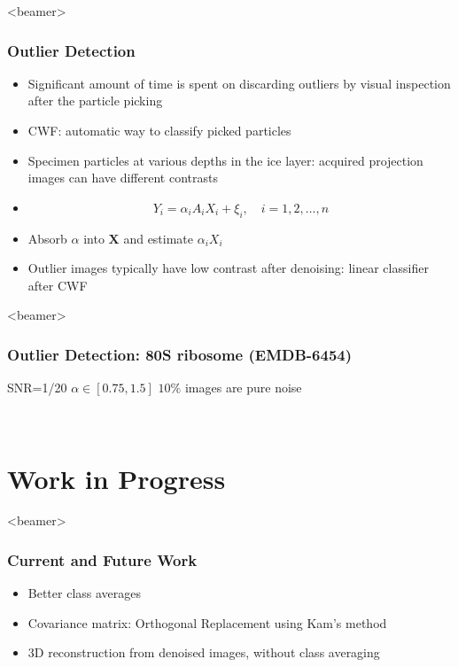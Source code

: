 \documentclass{beamer}
\begin{document}
\begin{frame}<beamer>
\frametitle{Outlier Detection}
\begin{itemize}[<+->]
 \item  Significant amount of time is spent on discarding outliers by visual inspection
after the particle picking 
\item CWF:  automatic way to classify picked particles
\item Specimen particles at various depths in the ice layer: acquired
projection images can have different contrasts
\item 
\begin{equation}
 Y_i = \alpha_i A_i X_i + \xi_i, \quad i=1,2,\ldots,n
\label{eqn:contrast}
\end{equation}
\item Absorb $\alpha$ into $\textbf{X}$ and estimate $\alpha_i X_i$ 
\item  Outlier images typically have low contrast
after denoising: linear classifier
after CWF 
\end{itemize}
\end{frame}

\begin{frame}<beamer>
\frametitle{Outlier Detection: 80S ribosome (EMDB-6454)}
SNR=1/20 
$\alpha \in [0.75,1.5]$
$10\%$ images are pure noise
\begin{figure}[]
\centering
{}
\quad
{} \\
\quad
{}
\end{figure}
\end{frame}

\section{Work in Progress}
\begin{frame}<beamer>
\frametitle{Current and Future Work}
\begin{itemize}[<+->]
 \item Better class averages
 \item Covariance matrix: Orthogonal Replacement using Kam's method
 \item 3D reconstruction from denoised images, without class averaging
\end{itemize}
\end{frame}
\end{document}
